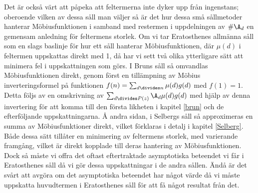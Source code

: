 Det är också värt att påpeka att feltermerna inte dyker upp från ingenstans; oberoende vilken av dessa såll man väljer så är det hur dessa små sållmetoder hanterar Möbiusfunktionen i samband med restermen i uppdelningen av \(\#\A_d\) en gemensam anledning för feltermens storlek.
Om vi tar Eratosthenes allmänna såll som en slags baslinje för hur ett såll hanterar Möbiusfunktionen, där \(\mu(d)\) i feltermen uppskattas direkt med 1, då har vi sett två olika ytterligare sätt att minimera fel i uppskattningen som görs. 
I Bruns såll så omvandlas Möbiusfunktionen direkt, genom först en tillämpning av Möbius inverteringsformel på funktionen \(f(n) = \sum_{d\divides n}\mu(d)g(d)\) med \(f(1) = 1\). 
Detta följs av en omskrivning av \(\sum_{d\divides P(z)}\A_d \mu(d) g(d)\) med hjälp av denna invertering för att komma till den första likheten i kapitel \ref{brun} och de efterföljande uppskattningarna. 
Å andra sidan, i Selbergs såll så approximeras en summa av Möbiusfunktioner direkt, vilket förklaras i detalj i kapitel \ref{Selberg}.
Både dessa sätt tillåter en minimering av feltermens storlek, med varierande framgång, vilket är direkt kopplade till deras hantering av Möbiusfunktionen.
Dock så måste vi offra det oftast eftertraktade asymptotiska beteendet vi får i Eratosthenes såll då vi gör dessa uppskattningar i de andra sållen.
Ändå är det svårt att avgöra om det asymptotiska beteendet har något värde då vi måste uppskatta huvudtermen i Eratosthenes såll för att få något resultat från det.



